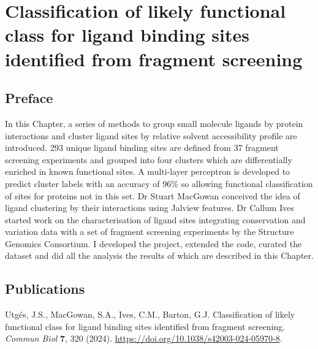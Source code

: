 \chapter{Classification of likely functional class for ligand binding sites identified from fragment screening}
\label{chap:FRAGSYS}

\section*{Preface}

In this Chapter, a series of methods to group small molecule ligands by protein interactions and cluster ligand sites by relative solvent accessibility profile are introduced. 293 unique ligand binding sites are defined from 37 fragment screening experiments and grouped into four clusters which are differentially enriched in known functional sites. A multi-layer perceptron is developed to predict cluster labels with an accuracy of 96\% so allowing functional classification of sites for proteins not in this set. Dr Stuart MacGowan conceived the idea of ligand clustering by their interactions using Jalview features. Dr Callum Ives started work on the characterisation of ligand sites integrating conservation and variation data with a set of fragment screening experiments by the Structure Genomics Consortium. I developed the project, extended the code, curated the dataset and did all the analysis the results of which are described in this Chapter.

\section*{Publications}

Utgés, J.S., MacGowan, S.A., Ives, C.M., Barton, G.J. Classification of likely functional class for ligand binding sites identified from fragment screening. \textit{Commun Biol} \textbf{7}, 320 (2024). \url{https://doi.org/10.1038/s42003-024-05970-8}.



